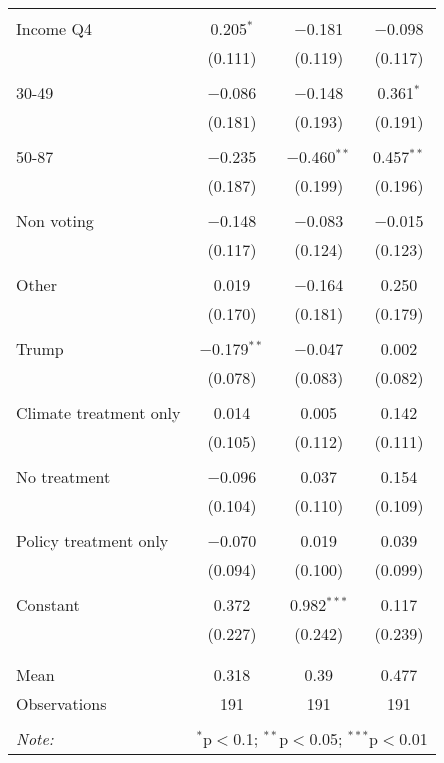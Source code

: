 \begin{tabular}{@{\extracolsep{5pt}}lccc}
  & & & \\ 
 Income Q4 & 0.205$^{*}$ & $-$0.181 & $-$0.098 \\ 
  & (0.111) & (0.119) & (0.117) \\ 
  & & & \\ 
 30-49 & $-$0.086 & $-$0.148 & 0.361$^{*}$ \\ 
  & (0.181) & (0.193) & (0.191) \\ 
  & & & \\ 
 50-87 & $-$0.235 & $-$0.460$^{**}$ & 0.457$^{**}$ \\ 
  & (0.187) & (0.199) & (0.196) \\ 
  & & & \\ 
 Non voting & $-$0.148 & $-$0.083 & $-$0.015 \\ 
  & (0.117) & (0.124) & (0.123) \\ 
  & & & \\ 
 Other & 0.019 & $-$0.164 & 0.250 \\ 
  & (0.170) & (0.181) & (0.179) \\ 
  & & & \\ 
 Trump & $-$0.179$^{**}$ & $-$0.047 & 0.002 \\ 
  & (0.078) & (0.083) & (0.082) \\ 
  & & & \\ 
 Climate treatment only & 0.014 & 0.005 & 0.142 \\ 
  & (0.105) & (0.112) & (0.111) \\ 
  & & & \\ 
 No treatment & $-$0.096 & 0.037 & 0.154 \\ 
  & (0.104) & (0.110) & (0.109) \\ 
  & & & \\ 
 Policy treatment only & $-$0.070 & 0.019 & 0.039 \\ 
  & (0.094) & (0.100) & (0.099) \\ 
  & & & \\ 
 Constant & 0.372 & 0.982$^{***}$ & 0.117 \\ 
  & (0.227) & (0.242) & (0.239) \\ 
  & & & \\ 
\hline \\[-1.8ex] 
Mean & 0.318 & 0.39 & 0.477 \\ 
Observations & 191 & 191 & 191 \\ 
\hline 
\hline \\[-1.8ex] 
\textit{Note:}  & \multicolumn{3}{r}{$^{*}$p$<$0.1; $^{**}$p$<$0.05; $^{***}$p$<$0.01} \\ 
\end{tabular} 
